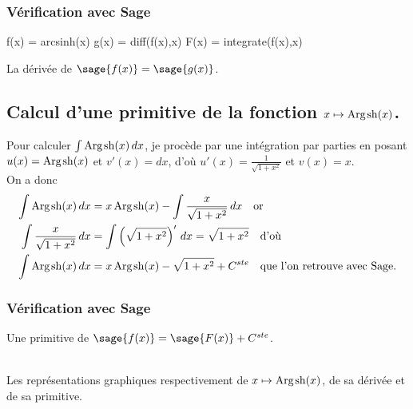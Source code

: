 \documentclass[a4paper,12pt]{report}
\renewcommand{\sinh}{\mathop{\mathrm{sh}}}
\renewcommand{\arg}{\mathop{\mathrm{Arg}}}
\begin{document}
\subsubsection{Vérification avec Sage}


\begin{sageblock}
    f(x) = arcsinh(x)
    g(x) = diff(f(x),x)
    F(x) = integrate(f(x),x)
\end{sageblock}

La dérivée de $\sage{f(x)} = \sage{g(x)} $.


\subsection{Calcul d'une primitive de la fonction  $x \mapsto \arg\mspace{-1mu}\sinh(x)$.}

Pour calculer $\int \arg\mspace{-1mu}\sinh(x) \, dx$, je procède par une intégration par parties en posant $u(x) = \arg\mspace{-1mu}\sinh(x)$ et $v'(x) = dx$, d'où $u'(x) = \frac{1}{ \sqrt{1+x^2}}$ et $ v(x) = x $. \\
On a donc
\begin{align*}
\int \arg\mspace{-1mu}\sinh(x) \, dx & = x \arg\mspace{-1mu}\sinh(x) - \int \frac{x}{ \sqrt{1+x^2}} \, dx \quad \textrm{or}\\
\int \frac{x}{ \sqrt{1+x^2}} \, dx & = \int \left(\sqrt{1+x^2}\right)' \, dx = \sqrt{1+x^2}  \quad \textrm{d'où}\\
\int \arg\mspace{-1mu}\sinh(x) \, dx & = x \arg\mspace{-1mu}\sinh(x) - \sqrt{1+x^2} + C^{ste} \quad \textrm{que l'on retrouve avec Sage.}
\end{align*}


\subsubsection{Vérification avec Sage}

Une primitive de $\sage{f(x)} = \sage{F(x)} + C^{ste} $.

\begin{center}
\\
Les représentations graphiques respectivement de $x \mapsto \arg\mspace{-1mu}\sinh(x)$, de sa dérivée et de sa primitive.
\end{center}
\end{document}
